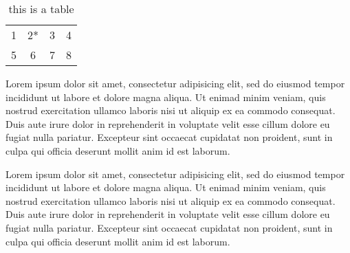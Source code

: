 \documentclass[12pt]{article}
\begin{document}
\begin{table}
  \begin{longtable}[l]{l c c r}
    \caption{this is a table}\\
    \hline
    1&2*&3&4\\
    5&6&7&8\\
    \hline
  \end{longtable}
\end{table}

Lorem ipsum dolor sit amet, consectetur adipisicing elit, sed do eiusmod tempor incididunt ut labore et dolore magna aliqua. Ut enimad minim veniam, quis nostrud exercitation ullamco laboris nisi ut aliquip ex ea commodo consequat. Duis aute irure dolor in reprehenderit in voluptate velit esse cillum dolore eu fugiat nulla pariatur. Excepteur sint occaecat cupidatat non proident, sunt in culpa qui officia deserunt mollit anim id est laborum.

Lorem ipsum dolor sit amet, consectetur adipisicing elit, sed do eiusmod tempor incididunt ut labore et dolore magna aliqua. Ut enimad minim veniam, quis nostrud exercitation ullamco laboris nisi ut aliquip ex ea commodo consequat. Duis aute irure dolor in reprehenderit in voluptate velit esse cillum dolore eu fugiat nulla pariatur. Excepteur sint occaecat cupidatat non proident, sunt in culpa qui officia deserunt mollit anim id est laborum.

\printbibliography[heading=bibnumbered]{}
\end{document}
